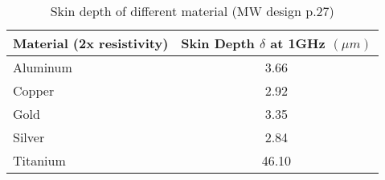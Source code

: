 \begin{table}
\caption{Skin depth of different material (MW design p.27)}
\label{tab:skin-depth}
\begin{tabular}{l|c}
\toprule
Material (2x resistivity) & \makecell{Skin Depth\\$\delta$ at 1GHz $(\unit{\mu m})$} \\
\midrule
\hline
Aluminum & 3.66 \\
Copper & 2.92 \\
Gold & 3.35 \\
Silver & 2.84 \\
Titanium & 46.10 \\
\bottomrule
\end{tabular}
\end{table}